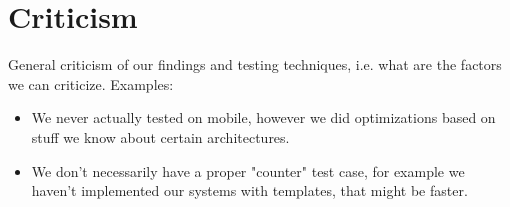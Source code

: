 \section{Criticism}
General criticism of our findings and testing techniques,
i.e. what are the factors we can criticize.
Examples:
\begin{itemize}
    \item
    We never actually tested on mobile, however we did optimizations based on stuff we know about certain architectures.

    \item
    We don't necessarily have a proper "counter" test case, for example we haven't implemented our systems with templates, that might be faster.
\end{itemize}

